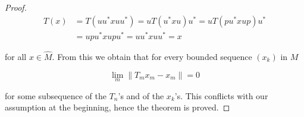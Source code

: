 \begin{proof}
\begin{align*}
T(x) &= T(uu^*xuu^*) = uT(u^*xu)u^* = uT(pu^*xup)u^* \\
&= upu^*xupu^* = uu^*xuu^* = x
\end{align*}

for all $x \in \widehat{M}$.
From this we obtain that for every bounded sequence $(x_k)$ in $M$

\[
\lim_m \|T_m x_m - x_m\| = 0
\]

for some subsequence of the $T_n$'s and of the $x_k$'s.
This conflicts with our assumption at the beginning, hence the theorem is proved.
\end{proof}